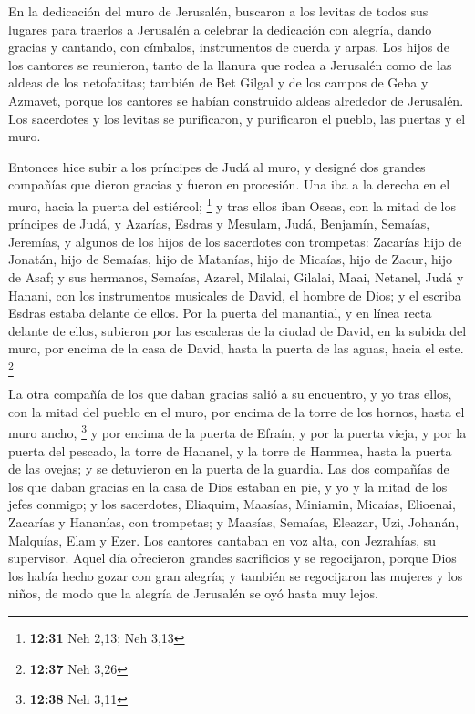  En la dedicación del muro de Jerusalén, buscaron a los
levitas de todos sus lugares para traerlos a Jerusalén a celebrar la
dedicación con alegría, dando gracias y cantando, con címbalos,
instrumentos de cuerda y arpas.  Los hijos de los
cantores se reunieron, tanto de la llanura que rodea a Jerusalén como de
las aldeas de los netofatitas;  también de Bet Gilgal y
de los campos de Geba y Azmavet, porque los cantores se habían
construido aldeas alrededor de Jerusalén.  Los sacerdotes
y los levitas se purificaron, y purificaron el pueblo, las puertas y el
muro.

 Entonces hice subir a los príncipes de Judá al muro, y
designé dos grandes compañías que dieron gracias y fueron en procesión.
Una iba a la derecha en el muro, hacia la puerta del estiércol;
\footnote{\textbf{12:31} Neh 2,13; Neh 3,13}  y tras
ellos iban Oseas, con la mitad de los príncipes de Judá, 
y Azarías, Esdras y Mesulam,  Judá, Benjamín, Semaías,
Jeremías,  y algunos de los hijos de los sacerdotes con
trompetas: Zacarías hijo de Jonatán, hijo de Semaías, hijo de Matanías,
hijo de Micaías, hijo de Zacur, hijo de Asaf;  y sus
hermanos, Semaías, Azarel, Milalai, Gilalai, Maai, Netanel, Judá y
Hanani, con los instrumentos musicales de David, el hombre de Dios; y el
escriba Esdras estaba delante de ellos.  Por la puerta
del manantial, y en línea recta delante de ellos, subieron por las
escaleras de la ciudad de David, en la subida del muro, por encima de la
casa de David, hasta la puerta de las aguas, hacia el este. \footnote{\textbf{12:37}
  Neh 3,26}

 La otra compañía de los que daban gracias salió a su
encuentro, y yo tras ellos, con la mitad del pueblo en el muro, por
encima de la torre de los hornos, hasta el muro ancho, \footnote{\textbf{12:38}
  Neh 3,11}  y por encima de la puerta de Efraín, y por
la puerta vieja, y por la puerta del pescado, la torre de Hananel, y la
torre de Hammea, hasta la puerta de las ovejas; y se detuvieron en la
puerta de la guardia.  Las dos compañías de los que daban
gracias en la casa de Dios estaban en pie, y yo y la mitad de los jefes
conmigo;  y los sacerdotes, Eliaquim, Maasías, Miniamin,
Micaías, Elioenai, Zacarías y Hananías, con trompetas;  y
Maasías, Semaías, Eleazar, Uzi, Johanán, Malquías, Elam y Ezer. Los
cantores cantaban en voz alta, con Jezrahías, su supervisor.
 Aquel día ofrecieron grandes sacrificios y se
regocijaron, porque Dios los había hecho gozar con gran alegría; y
también se regocijaron las mujeres y los niños, de modo que la alegría
de Jerusalén se oyó hasta muy lejos.

